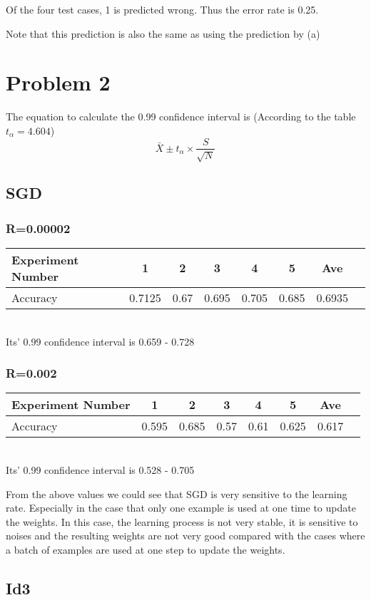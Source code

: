 \noindent Of the four test cases, 1 is predicted wrong. Thus the error rate is 0.25.

Note that this prediction is also the same as using the prediction by (a)
\section{Problem 2}
\noindent The equation to calculate the 0.99 confidence interval is (According to the table $t_\alpha=4.604$)
\begin{equation}
\bar{X}\pm t_\alpha\times\frac{S}{\sqrt{N}}	
\end{equation}

\subsection{SGD}
\subsubsection{R=0.00002}
\begin{tabular}{l*{6}{c}r}
Experiment Number  & 1 & 2 & 3 & 4 & 5  & Ave  \\
	\hline
	Accuracy      & 0.7125 & 0.67 & 0.695 & 0.705 & 0.685 & 0.6935   \\
\end{tabular}
\\Its' 0.99 confidence interval is 0.659 - 0.728

\subsubsection{R=0.002}
\begin{tabular}{l*{6}{c}r}
	Experiment Number  & 1 & 2 & 3 & 4 & 5  & Ave  \\
	\hline
	Accuracy      & 0.595 & 0.685 & 0.57 & 0.61 & 0.625 & 0.617   \\
\end{tabular}
\\Its' 0.99 confidence interval is 0.528 - 0.705

\noindent From the above values we could see that SGD is very sensitive to the learning rate. Especially in the case that only one example is used at one time to update the weights. In this case, the learning process is not very stable, it is sensitive to noises and the resulting weights are not very good compared with the cases where a batch of examples are used at one step to update the weights.

\subsection{Id3}
